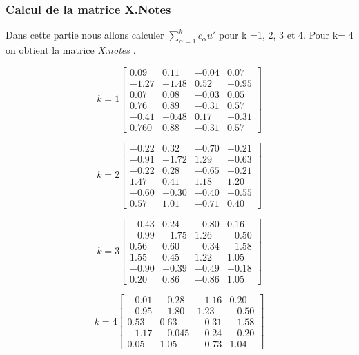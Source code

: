 \documentclass[10pt]{article}
\begin{document}
	\subsubsection{ Calcul de la matrice X.Notes}
	Dans cette partie nous allons calculer $\sum_{\alpha = 1}^{k} c_{\alpha}u'$ pour k =1, 2, 3 et 4. Pour k= 4 on obtient la matrice \textit{X.notes }. \\
	\begin{minipage}[t]{0.5\textwidth}
	\[
	k=1
	\begin{bmatrix}
	0.09 &	0.11 &	-0.04	& 0.07\\
	-1.27	& -1.48 &	0.52	& -0.95\\
	0.07	& 0.08 &	-0.03	& 0.05\\
	0.76&	0.89 &	-0.31	& 0.57\\
	-0.41	& -0.48 &	0.17	& -0.31\\
	0.760	& 0.88	& -0.31 &	0.57
	\end{bmatrix}
	\]
	\end{minipage}
	\begin{minipage}[t]{0.5\textwidth}
	\[
		k=2
		\begin{bmatrix}
		-0.22 &	0.32 &	-0.70 &	-0.21\\
	-0.91 &	-1.72 &	1.29 &	-0.63\\
	-0.22 &	0.28 &	-0.65 &	-0.21\\
	1.47 &	0.41 &	1.18 &	1.20 \\
	-0.60 &	-0.30 &	-0.40 &	-0.55\\
	0.57&	1.01 &	-0.71	& 0.40	
		\end{bmatrix}
	\]
	\end{minipage}



\begin{minipage}[t]{0.5\textwidth}
	\[
	k=3
	\begin{bmatrix}
	-0.43 &	0.24 &	-0.80 &	0.16\\
	-0.99 &	-1.75 &	1.26 &	-0.50\\
	0.56 &	0.60 &	-0.34 &	-1.58\\
	1.55&	0.45 &	1.22 &	1.05\\
	-0.90 &	-0.39 &	-0.49 &	-0.18\\
	0.20 &	0.86  &	-0.86 &	1.05
	
	\end{bmatrix}
	\]
\end{minipage}
\begin{minipage}[t]{0.5\textwidth}
	\[
	k=4
	\begin{bmatrix}
	-0.01	& -0.28& 	-1.16	&  0.20\\
	-0.95	&  -1.80 & 	1.23 & 	-0.50\\
	0.53 & 	0.63 & 	-0.31	&  -1.58\\
	-1.17	& -0.045 &	-0.24	& -0.20\\
	0.05 &	1.05 &	-0.73 &	1.04
	
	\end{bmatrix}
	\]
\end{minipage}
\end{document}
